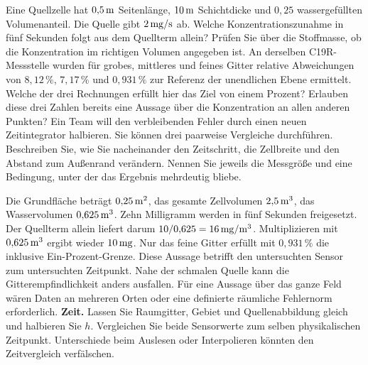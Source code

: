 Eine Quellzelle hat \(0{,}5\,\mathrm{m}\) Seitenlänge, \(10\,\mathrm{m}\) Schichtdicke und \(0{,}25\) wassergefüllten Volumenanteil. Die Quelle gibt \(2\,\mathrm{mg/s}\) ab. Welche Konzentrationszunahme in fünf Sekunden folgt aus dem Quellterm allein? Prüfen Sie über die Stoffmasse, ob die Konzentration im richtigen Volumen angegeben ist.
An derselben C19R-Messstelle wurden für grobes, mittleres und feines Gitter relative Abweichungen von \(8{,}12\,\%\), \(7{,}17\,\%\) und \(0{,}931\,\%\) zur Referenz der unendlichen Ebene ermittelt. Welche der drei Rechnungen erfüllt hier das Ziel von einem Prozent? Erlauben diese drei Zahlen bereits eine Aussage über die Konzentration an allen anderen Punkten?
Ein Team will den verbleibenden Fehler durch einen neuen Zeitintegrator halbieren. Sie können drei paarweise Vergleiche durchführen. Beschreiben Sie, wie Sie nacheinander den Zeitschritt, die Zellbreite und den Abstand zum Außenrand verändern. Nennen Sie jeweils die Messgröße und eine Bedingung, unter der das Ergebnis mehrdeutig bliebe.

\schreibfeld



Die Grundfläche beträgt \(0{,}25\,\mathrm{m^2}\), das gesamte Zellvolumen \(2{,}5\,\mathrm{m^3}\), das Wasservolumen \(0{,}625\,\mathrm{m^3}\). Zehn Milligramm werden in fünf Sekunden freigesetzt. Der Quellterm allein liefert darum \(10/0{,}625=16\,\mathrm{mg/m^3}\). Multiplizieren mit \(0{,}625\,\mathrm{m^3}\) ergibt wieder \(10\,\mathrm{mg}\).
Nur das feine Gitter erfüllt mit \(0{,}931\,\%\) die inklusive Ein-Prozent-Grenze. Diese Aussage betrifft den untersuchten Sensor zum untersuchten Zeitpunkt. Nahe der schmalen Quelle kann die Gitterempfindlichkeit anders ausfallen. Für eine Aussage über das ganze Feld wären Daten an mehreren Orten oder eine definierte räumliche Fehlernorm erforderlich.
\textbf{Zeit.} Lassen Sie Raumgitter, Gebiet und Quellenabbildung gleich und halbieren Sie \(h\). Vergleichen Sie beide Sensorwerte zum selben physikalischen Zeitpunkt. Unterschiede beim Auslesen oder Interpolieren könnten den Zeitvergleich verfälschen.

